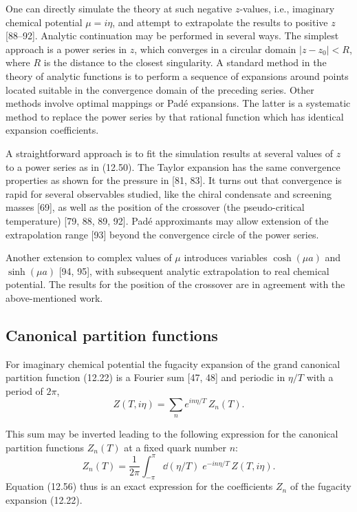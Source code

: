 One can directly simulate the theory at such negative $z$-values, i.e.,
imaginary chemical potential $\mu = i\eta$, and attempt to extrapolate the
results to positive $z$ [88--92]. Analytic continuation may be performed in
several ways. The simplest approach is a power series in $z$, which converges
in a circular domain $|z - z_0| < R$, where $R$ is the distance to the closest
singularity. A standard method in the theory of analytic functions is to
perform a sequence of expansions around points located suitable in the
convergence domain of the preceding series. Other methods involve optimal
mappings or Pad\'e expansions. The latter is a systematic method to replace the
power series by that rational function which has identical expansion
coefficients.

A straightforward approach is to fit the simulation results at several values
of $z$ to a power series as in (12.50). The Taylor expansion has the same
convergence properties as shown for the pressure in [81, 83]. It turns out that
convergence is rapid for several observables studied, like the chiral
condensate and screening masses [69], as well as the position of the crossover
(the pseudo-critical temperature) [79, 88, 89, 92]. Pad\'e approximants may
allow extension of the extrapolation range [93] beyond the convergence circle
of the power series.

Another extension to complex values of $\mu$ introduces variables
$\cosh(\mu a)$ and $\sinh(\mu a)$ [94, 95], with subsequent analytic
extrapolation to real chemical potential. The results for the position of the
crossover are in agreement with the above-mentioned work.

\subsection{Canonical partition functions}

For imaginary chemical potential the fugacity expansion of the grand canonical
partition function (12.22) is a Fourier sum [47, 48] and periodic in $\eta/T$
with a period of $2\pi$,
\begin{equation}
  Z(T, i\eta) = \sum_n e^{i n\eta/T}\,Z_n(T).
\end{equation}

This sum may be inverted leading to the following expression for the canonical
partition functions $Z_n(T)$ at a fixed quark number $n$:
\begin{equation}
  Z_n(T) = \frac{1}{2\pi}\int_{-\pi}^{\pi}\dd(\eta/T)\;
    e^{-i n\eta/T}\,Z(T, i\eta).
\end{equation}
Equation (12.56) thus is an exact expression for the coefficients $Z_n$ of the
fugacity expansion (12.22).

